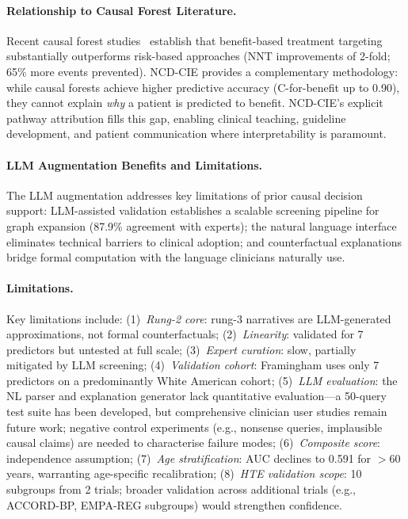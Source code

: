 \documentclass[runningheads]{llncs}
\begin{document}
\paragraph{Relationship to Causal Forest Literature.}
Recent causal forest studies~\cite{inoue2023causalforest,nakamura2025statin,liu2025china,mori2026sglt2i,lupson2022glycemic}
establish that benefit-based treatment targeting substantially
outperforms risk-based approaches (NNT improvements of 2-fold;
65\% more events prevented).
NCD-CIE provides a complementary methodology: while causal forests
achieve higher predictive accuracy (C-for-benefit up to 0.90),
they cannot explain \emph{why} a patient is predicted to benefit.
NCD-CIE's explicit pathway attribution fills this gap, enabling
clinical teaching, guideline development, and patient communication
where interpretability is paramount.

\paragraph{LLM Augmentation Benefits and Limitations.}
The LLM augmentation addresses key limitations of prior causal
decision support: LLM-assisted validation establishes a scalable
screening pipeline for graph expansion (87.9\% agreement with experts);
the natural language interface eliminates technical barriers to
clinical adoption; and counterfactual explanations bridge formal
computation with the language clinicians naturally use.

\paragraph{Limitations.}
Key limitations include:
(1)~\emph{Rung-2 core}: rung-3 narratives are LLM-generated
approximations, not formal counterfactuals;
(2)~\emph{Linearity}: validated for 7 predictors but untested at
full scale;
(3)~\emph{Expert curation}: slow, partially mitigated by LLM screening;
(4)~\emph{Validation cohort}: Framingham uses only 7 predictors on a
predominantly White American cohort;
(5)~\emph{LLM evaluation}: the NL parser and explanation generator
lack quantitative evaluation---a 50-query test suite has been developed,
but comprehensive clinician user studies remain future work;
negative control experiments (e.g., nonsense queries, implausible
causal claims) are needed to characterise failure modes;
(6)~\emph{Composite score}: independence assumption;
(7)~\emph{Age stratification}: AUC declines to 0.591 for $>$60 years,
warranting age-specific recalibration;
(8)~\emph{HTE validation scope}: 10 subgroups from 2 trials; broader
validation across additional trials (e.g., ACCORD-BP, EMPA-REG
subgroups) would strengthen confidence.
\end{document}
